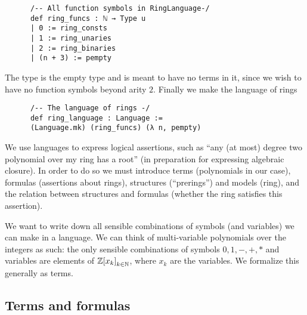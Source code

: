 \begin{dfn}
    \begin{lstlisting}
      /-- All function symbols in RingLanguage-/
      def ring_funcs : ℕ → Type u
      | 0 := ring_consts
      | 1 := ring_unaries
      | 2 := ring_binaries
      | (n + 3) := pempty\end{lstlisting}

    The type  is the empty type and is meant to have no terms in it,
    since we wish to have no function symbols beyond arity $2$.
    Finally we make the language of rings

    \begin{lstlisting}
      /-- The language of rings -/
      def ring_language : Language :=
      (Language.mk) (ring_funcs) (λ n, pempty)\end{lstlisting}
\end{dfn}

We use languages to express logical assertions, such as
``any (at most) degree two polynomial over my ring has a root''
(in preparation for expressing algebraic closure).
In order to do so we must introduce terms (polynomials in our case),
formulas (assertions about rings), structures (``prerings'') and models (ring),
and the relation between structures and formulas
(whether the ring satisfies this assertion).

We want to write down all sensible combinations of symbols (and variables)
we can make in a language.
We can think of multi-variable polynomials over the integers as such:
the only sensible combinations of symbols $0,1,-,+,*$ and variables
are elements of $\mathbb{Z}{[x_{k}]}_{k \in \mathbb{N}}$,
where $x_{k}$ are the variables. We formalize this generally as terms.

\subsection{Terms and formulas}

